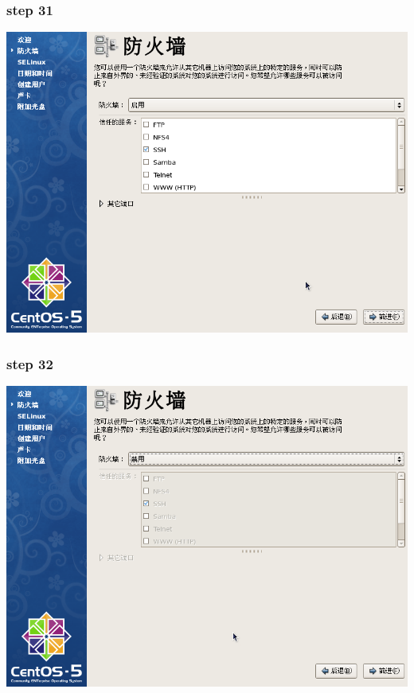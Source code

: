 \documentclass[xcolor=svgnames,presentation]{beamer}
\begin{document}
\begin{frame}
\frametitle{step 31}
\label{sec-2-31}

\begin{center}
\includegraphics[width=.9\linewidth]{img/img53.png}
\end{center}
\end{frame}
\begin{frame}
\frametitle{step 32}
\label{sec-2-32}

\begin{center}
\includegraphics[width=.9\linewidth]{img/img54.png}
\end{center}
\end{frame}
\end{document}
